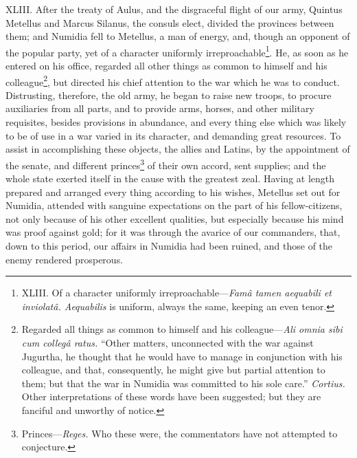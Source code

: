 XLIII. After the treaty of Aulus, and the disgraceful flight of our
army, Quintus Metellus and Marcus Silanus, the consuls elect, divided
the provinces between them; and Numidia fell to Metellus, a man of
energy, and, though an opponent of the popular party, yet of a
character uniformly irreproachable\footnote{XLIII. Of a character uniformly irreproachable—\emph{Famâ tamen
aequabili et inviolatâ. Aequabilis} is uniform, always the same,
keeping an even tenor.}. He, as soon as he entered on
his office, regarded all other things as common to himself and his
colleague\footnote{Regarded all things as common to himself and his colleague—\emph{Ali
omnia sibi cum collegâ ratus.} ``Other matters, unconnected with the war
against Jugurtha, he thought that he would have to manage in
conjunction with his colleague, and that, consequently, he might give
but partial attention to them; but that the war in Numidia was
committed to his sole care.'' \emph{Cortius.} Other interpretations of these
words have been suggested; but they are fanciful and unworthy of notice.}, but directed his chief attention to the war which he
was to conduct. Distrusting, therefore, the old army, he began to
raise new troops, to procure auxiliaries from all parts, and to
provide arms, horses, and other military requisites, besides
provisions in abundance, and every thing else which was likely to be
of use in a war varied in its character, and demanding great
resources. To assist in accomplishing these objects, the allies and
Latins, by the appointment of the senate, and different princes\footnote{Princes—\emph{Reges.} Who these were, the commentators have not
attempted to conjecture.}
of their own accord, sent supplies; and the whole state exerted itself
in the cause with the greatest zeal. Having at length prepared and
arranged every thing according to his wishes, Metellus set out for
Numidia, attended with sanguine expectations on the part of his
fellow-citizens, not only because of his other excellent qualities,
but especially because his mind was proof against gold; for it was
through the avarice of our commanders, that, down to this period, our
affairs in Numidia had been ruined, and those of the enemy rendered
prosperous.

